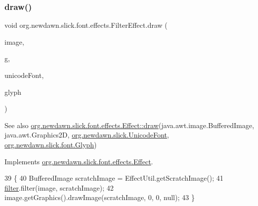 \subsubsection{\texorpdfstring{draw()}{draw()}}
{\footnotesize\ttfamily void org.\+newdawn.\+slick.\+font.\+effects.\+Filter\+Effect.\+draw (\begin{DoxyParamCaption}\item[{Buffered\+Image}]{image,  }\item[{Graphics2D}]{g,  }\item[{\mbox{\hyperlink{classorg_1_1newdawn_1_1slick_1_1_unicode_font}{Unicode\+Font}}}]{unicode\+Font,  }\item[{\mbox{\hyperlink{classorg_1_1newdawn_1_1slick_1_1font_1_1_glyph}{Glyph}}}]{glyph }\end{DoxyParamCaption})\hspace{0.3cm}{\ttfamily [inline]}}

\begin{DoxySeeAlso}{See also}
\mbox{\hyperlink{interfaceorg_1_1newdawn_1_1slick_1_1font_1_1effects_1_1_effect_a234db1cd6151bdbe9fda2099ee71eafb}{org.\+newdawn.\+slick.\+font.\+effects.\+Effect\+::draw}}(java.\+awt.\+image.\+Buffered\+Image, java.\+awt.\+Graphics2D, \mbox{\hyperlink{classorg_1_1newdawn_1_1slick_1_1_unicode_font}{org.\+newdawn.\+slick.\+Unicode\+Font}}, \mbox{\hyperlink{classorg_1_1newdawn_1_1slick_1_1font_1_1_glyph}{org.\+newdawn.\+slick.\+font.\+Glyph}}) 
\end{DoxySeeAlso}


Implements \mbox{\hyperlink{interfaceorg_1_1newdawn_1_1slick_1_1font_1_1effects_1_1_effect_a234db1cd6151bdbe9fda2099ee71eafb}{org.\+newdawn.\+slick.\+font.\+effects.\+Effect}}.


\begin{DoxyCode}
39                                                                                               \{
40         BufferedImage scratchImage = EffectUtil.getScratchImage();
41         \mbox{\hyperlink{classorg_1_1newdawn_1_1slick_1_1font_1_1effects_1_1_filter_effect_aafe0a98e55b983f1b26e5ed235d254be}{filter}}.filter(image, scratchImage);
42         image.getGraphics().drawImage(scratchImage, 0, 0, null);
43     \}
\end{DoxyCode}
\mbox{\label{classorg_1_1newdawn_1_1slick_1_1font_1_1effects_1_1_filter_effect_a3f5536a3d0e247e784e6fd2a6af26c6a}} 
